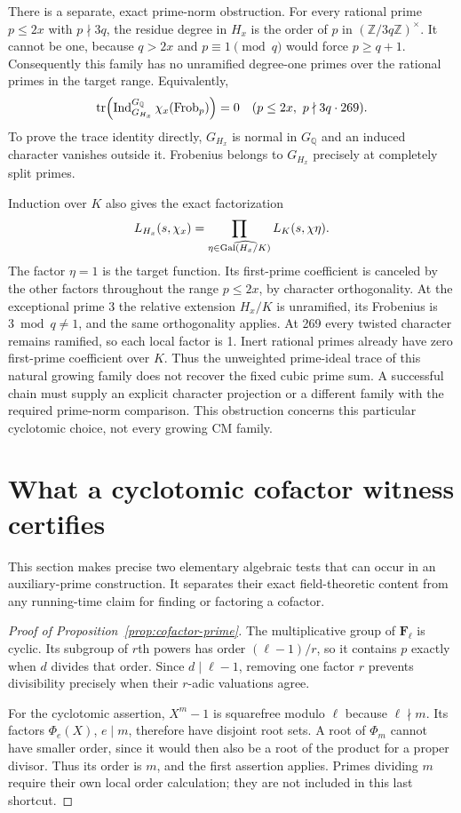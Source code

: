 \documentclass[11pt]{article}
\theoremstyle{remark}\newtheorem{remark}[theorem]{Remark}
\newcommand{\Q}{\mathbb Q}\newcommand{\Z}{\mathbb Z}\newcommand{\C}{\mathbb C}
\begin{document}
There is a separate, exact prime-norm obstruction. For every rational prime $p\le2x$ with $p\nmid3q$, the residue degree in $H_x$ is the order of $p$ in $(\Z/3q\Z)^\times$. It cannot be one, because $q>2x$ and $p\equiv1\pmod q$ would force $p\ge q+1$. Consequently this family has no unramified degree-one primes over the rational primes in the target range. Equivalently,
\[
 \tr\!\left(\operatorname{Ind}_{G_{H_x}}^{G_\Q}\chi_x
                  (\operatorname{Frob}_p)\right)=0
 \quad(p\le2x,\ p\nmid3q\cdot269).
\]
To prove the trace identity directly, $G_{H_x}$ is normal in $G_\Q$ and an induced character vanishes outside it. Frobenius belongs to $G_{H_x}$ precisely at completely split primes.

Induction over $K$ also gives the exact factorization
\[
 L_{H_x}(s,\chi_x)=
 \prod_{\eta\in\widehat{\operatorname{Gal}(H_x/K)}}L_K(s,\chi\eta).
\]
The factor $\eta=1$ is the target function. Its first-prime coefficient is canceled by the other factors throughout the range $p\le2x$, by character orthogonality. At the exceptional prime 3 the relative extension $H_x/K$ is unramified, its Frobenius is $3\bmod q\ne1$, and the same orthogonality applies. At 269 every twisted character remains ramified, so each local factor is 1. Inert rational primes already have zero first-prime coefficient over $K$. Thus the unweighted prime-ideal trace of this natural growing family does not recover the fixed cubic prime sum. A successful chain must supply an explicit character projection or a different family with the required prime-norm comparison. This obstruction concerns this particular cyclotomic choice, not every growing CM family.

\section{What a cyclotomic cofactor witness certifies}
This section makes precise two elementary algebraic tests that can occur in an auxiliary-prime construction. It separates their exact field-theoretic content from any running-time claim for finding or factoring a cofactor.

\begin{proof}[Proof of Proposition~\ref{prop:cofactor-prime}]
The multiplicative group of $\mathbf F_\ell$ is cyclic. Its subgroup of $r$th powers has order $(\ell-1)/r$, so it contains $p$ exactly when $d$ divides that order. Since $d\mid\ell-1$, removing one factor $r$ prevents divisibility precisely when their $r$-adic valuations agree.

For the cyclotomic assertion, $X^m-1$ is squarefree modulo $\ell$ because $\ell\nmid m$. Its factors $\Phi_e(X)$, $e\mid m$, therefore have disjoint root sets. A root of $\Phi_m$ cannot have smaller order, since it would then also be a root of the product for a proper divisor. Thus its order is $m$, and the first assertion applies. Primes dividing $m$ require their own local order calculation; they are not included in this last shortcut.
\end{proof}
\end{document}
